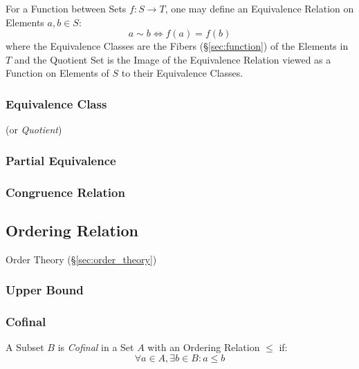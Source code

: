 For a Function between Sets $f : S \rightarrow T$, one may define an
Equivalence Relation on Elements $a,b \in S$:
\[
    a \sim b \Leftrightarrow f(a) = f(b)
\]
where the Equivalence Classes are the Fibers (\S\ref{sec:function}) of
the Elements in $T$ and the Quotient Set is the Image of the
Equivalence Relation viewed as a Function on Elements of $S$ to their
Equivalence Classes.



\subsubsection{Equivalence Class}\label{sec:equivalence_class}

(or \emph{Quotient})



\subsubsection{Partial Equivalence}\label{sec:partial_equivalence}

\subsubsection{Congruence Relation}\label{sec:congruence_relation}



\subsection{Ordering Relation}\label{sec:ordering_relation}

Order Theory (\S\ref{sec:order_theory})



\subsubsection{Upper Bound}\label{sec:upper_bound}

\subsubsection{Cofinal}\label{sec:cofinal}

A Subset $B$ is \emph{Cofinal} in a Set $A$ with an Ordering Relation
$\leq$ if:
\[
  \forall a \in A, \exists b \in B : a \leq b
\]



